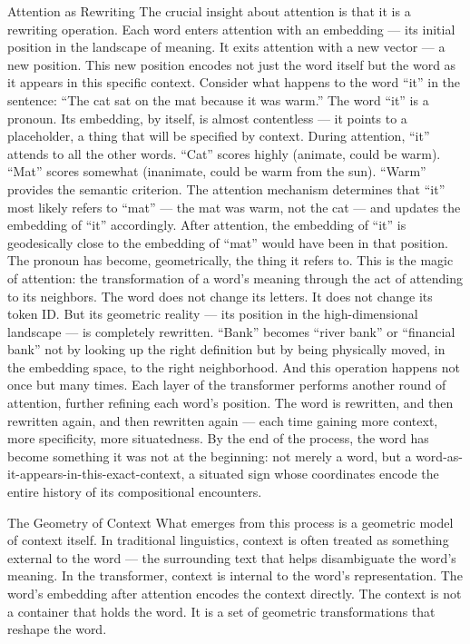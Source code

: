 Attention as Rewriting The crucial insight about attention is that it is a rewriting operation. Each word enters attention with an embedding — its initial position in the landscape of meaning. It exits attention with a new vector — a new position. This new position encodes not just the word itself but the word as it appears in this specific context. Consider what happens to the word “it” in the sentence: “The cat sat on the mat because it was warm.” The word “it” is a pronoun. Its embedding, by itself, is almost contentless — it points to a placeholder, a thing that will be specified by context. During attention, “it” attends to all the other words. “Cat” scores highly (animate, could be warm). “Mat” scores somewhat (inanimate, could be warm from the sun). “Warm” provides the semantic criterion. The attention mechanism determines that “it” most likely refers to “mat” — the mat was warm, not the cat — and updates the embedding of “it” accordingly. After attention, the embedding of “it” is geodesically close to the embedding of “mat” would have been in that position. The pronoun has become, geometrically, the thing it refers to. This is the magic of attention: the transformation of a word’s meaning through the act of attending to its neighbors. The word does not change its letters. It does not change its token ID. But its geometric reality — its position in the high-dimensional landscape — is completely rewritten. “Bank” becomes “river bank” or “financial bank” not by looking up the right definition but by being physically moved, in the embedding space, to the right neighborhood. And this operation happens not once but many times. Each layer of the transformer performs another round of attention, further refining each word’s position. The word is rewritten, and then rewritten again, and then rewritten again — each time gaining more context, more specificity, more situatedness. By the end of the process, the word has become something it was not at the beginning: not merely a word, but a word-as-it-appears-in-this-exact-context, a situated sign whose coordinates encode the entire history of its compositional encounters.

The Geometry of Context What emerges from this process is a geometric model of context itself. In traditional linguistics, context is often treated as something external to the word — the surrounding text that helps disambiguate the word’s meaning. In the transformer, context is internal to the word’s representation. The word’s embedding after attention encodes the context directly. The context is not a container that holds the word. It is a set of geometric transformations that reshape the word.

